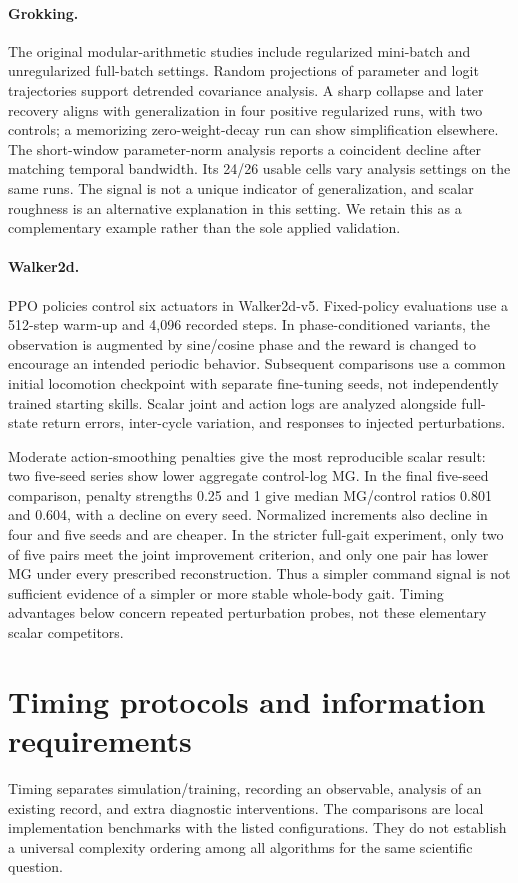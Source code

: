 {\paragraph{Grokking.}
The original modular-arithmetic studies include regularized mini-batch and unregularized full-batch settings. Random projections of parameter and logit trajectories support detrended covariance analysis. A sharp collapse and later recovery aligns with generalization in four positive regularized runs, with two controls; a memorizing zero-weight-decay run can show simplification elsewhere. The short-window parameter-norm analysis reports a coincident decline after matching temporal bandwidth. Its 24/26 usable cells vary analysis settings on the same runs. The signal is not a unique indicator of generalization, and scalar roughness is an alternative explanation in this setting. We retain this as a complementary example rather than the sole applied validation.

\paragraph{Walker2d.}
PPO policies control six actuators in Walker2d-v5. Fixed-policy evaluations use a 512-step warm-up and 4,096 recorded steps. In phase-conditioned variants, the observation is augmented by sine/cosine phase and the reward is changed to encourage an intended periodic behavior. Subsequent comparisons use a common initial locomotion checkpoint with separate fine-tuning seeds, not independently trained starting skills. Scalar joint and action logs are analyzed alongside full-state return errors, inter-cycle variation, and responses to injected perturbations.

Moderate action-smoothing penalties give the most reproducible scalar result: two five-seed series show lower aggregate control-log MG. In the final five-seed comparison, penalty strengths 0.25 and 1 give median MG/control ratios 0.801 and 0.604, with a decline on every seed. Normalized increments also decline in four and five seeds and are cheaper. In the stricter full-gait experiment, only two of five pairs meet the joint improvement criterion, and only one pair has lower MG under every prescribed reconstruction. Thus a simpler command signal is not sufficient evidence of a simpler or more stable whole-body gait. Timing advantages below concern repeated perturbation probes, not these elementary scalar competitors.

\section{Timing protocols and information requirements}\label{app:cost}
Timing separates simulation/training, recording an observable, analysis of an existing record, and extra diagnostic interventions. The comparisons are local implementation benchmarks with the listed configurations. They do not establish a universal complexity ordering among all algorithms for the same scientific question.

}
